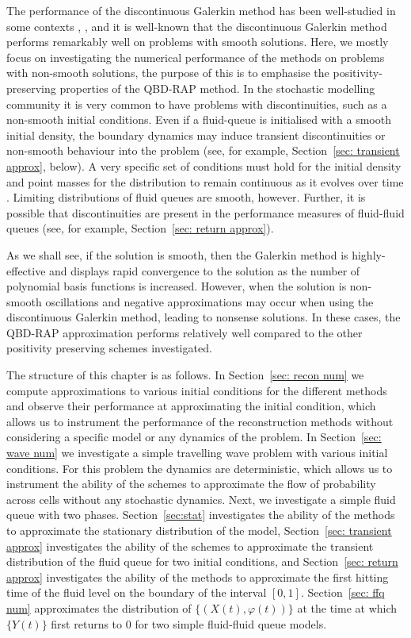 The performance of the discontinuous Galerkin method has been well-studied in some contexts \cite{c99}, \cite[Section~5.5]{nodalDGBook}, and it is well-known that the discontinuous Galerkin method performs remarkably well on problems with smooth solutions. Here, we mostly focus on investigating the numerical performance of the methods on problems with non-smooth solutions, the purpose of this is to emphasise the positivity-preserving properties of the QBD-RAP method. In the stochastic modelling community it is very common to have problems with discontinuities, such as a non-smooth initial conditions. Even if a fluid-queue is initialised with a smooth initial density, the boundary dynamics may induce transient discontinuities or non-smooth behaviour into the problem (see, for example, Section~\ref{sec: transient approx}, below). A very specific set of conditions must hold for the initial density and point masses for the distribution to remain continuous as it evolves over time \citep{bo2014,bop2020}. Limiting distributions of fluid queues are smooth, however. Further, it is possible that discontinuities are present in the performance measures of fluid-fluid queues (see, for example, Section~\ref{sec: return approx}). 

As we shall see, if the solution is smooth, then the Galerkin method is highly-effective and displays rapid convergence to the solution as the number of polynomial basis functions is increased. However, when the solution is non-smooth oscillations and negative approximations may occur when using the discontinuous Galerkin method, leading to nonsense solutions. In these cases, the QBD-RAP approximation performs relatively well compared to the other positivity preserving schemes investigated.

The structure of this chapter is as follows. In Section~\ref{sec: recon num} we compute approximations to various initial conditions for the different methods and observe their performance at approximating the initial condition, which allows us to instrument the performance of the reconstruction methods without considering a specific model or any dynamics of the problem. In Section~\ref{sec: wave num} we investigate a simple travelling wave problem with various initial conditions. For this problem the dynamics are deterministic, which allows us to instrument the ability of the schemes to approximate the flow of probability across cells without any stochastic dynamics. Next, we investigate a simple fluid queue with two phases. Section~\ref{sec:stat} investigates the ability of the methods to approximate the stationary distribution of the model, Section~\ref{sec: transient approx} investigates the ability of the schemes to approximate the transient distribution of the fluid queue for two initial conditions, and Section~\ref{sec: return approx} investigates the ability of the methods to approximate the first hitting time of the fluid level on the boundary of the interval \([0,1]\). Section~\ref{sec: ffq num} approximates the distribution of \(\{(X(t),\varphi(t))\}\) at the time at which \(\{Y(t)\}\) first returns to \(0\) for two simple fluid-fluid queue models.  

